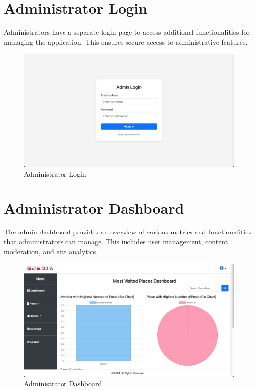 \section{Administrator Login}
Administrators have a separate login page to access additional functionalities for managing the application. This ensures secure access to administrative features.

\begin{figure}[H]
    \centering
    \includegraphics[width=\textwidth]{adminLogin.png}
    \caption{Administrator Login}
    \label{fig:adminLogin}
\end{figure}

\section{Administrator Dashboard}
The admin dashboard provides an overview of various metrics and functionalities that administrators can manage. This includes user management, content moderation, and site analytics.

\begin{figure}[H]
    \centering
    \includegraphics[width=\textwidth]{adminDash.png}
    \caption{Administrator Dashboard}
    \label{fig:adminDash}
\end{figure}

